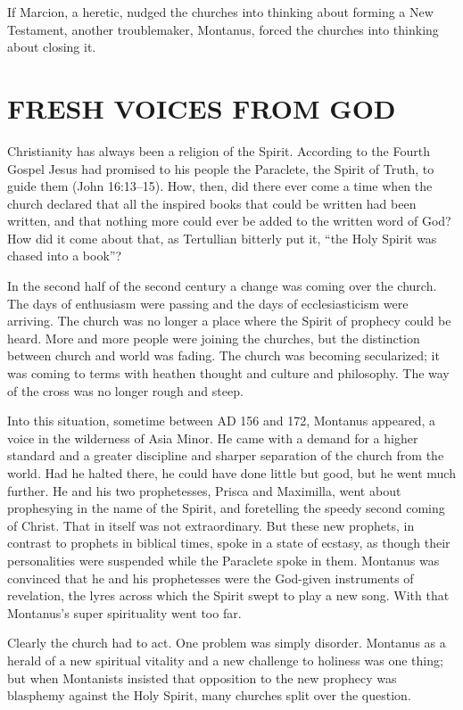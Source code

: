 If Marcion, a heretic, nudged the churches into thinking about forming a New Testament, another
troublemaker, Montanus, forced the churches into thinking about closing it.

\section{FRESH VOICES FROM GOD}

Christianity has always been a religion of the Spirit. According to the Fourth Gospel Jesus had
promised to his people the Paraclete, the Spirit of Truth, to guide them (John 16:13–15). How, then,
did there ever come a time when the church declared that all the inspired books that could be
written had been written, and that nothing more could ever be added to the written word of God? How
did it come about that, as Tertullian bitterly put it, “the Holy Spirit was chased into a book”?

In the second half of the second century a change was coming over the church. The days of enthusiasm
were passing and the days of ecclesiasticism were arriving. The church was no longer a place where
the Spirit of prophecy could be heard. More and more people were joining the churches, but the
distinction between church and world was fading. The church was becoming secularized; it was coming
to terms with heathen thought and culture and philosophy. The way of the cross was no longer rough
and steep.

Into this situation, sometime between AD 156 and 172, Montanus appeared, a voice in the wilderness
of Asia Minor. He came with a demand for a higher standard and a greater discipline and sharper
separation of the church from the world. Had he halted there, he could have done little but good,
but he went much further. He and his two prophetesses, Prisca and Maximilla, went about prophesying
in the name of the Spirit, and foretelling the speedy second coming of Christ. That in itself was
not extraordinary. But these new prophets, in contrast to prophets in biblical times, spoke in a
state of ecstasy, as though their personalities were suspended while the Paraclete spoke in them.
Montanus was convinced that he and his prophetesses were the God-given instruments of revelation,
the lyres across which the Spirit swept to play a new song. With that Montanus’s super spirituality
went too far.

Clearly the church had to act. One problem was simply disorder. Montanus as a herald of a new
spiritual vitality and a new challenge to holiness was one thing; but when Montanists insisted that
opposition to the new prophecy was blasphemy against the Holy Spirit, many churches split over the
question.

